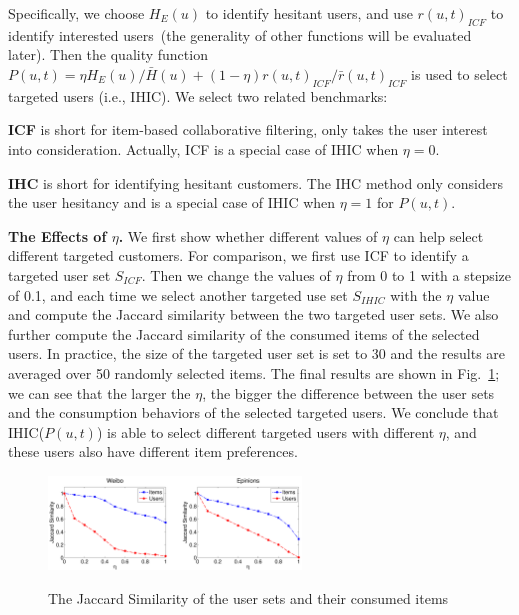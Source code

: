 \documentclass{llncs}
\begin{document}
Specifically, we choose $H_{E}(u)$ to identify hesitant users, and use $r(u,t)_{ICF}$ to identify interested users~(the generality of other functions will be evaluated later). Then the quality function $P(u,t) = \eta H_{E}(u)/ \bar{H}(u) + (1-\eta) r(u,t)_{ICF}/\bar{r}(u,t)_{ICF}$ is used to select targeted users (i.e., IHIC). We select two related benchmarks:
\begin{compactitem}
  \item \textbf{ICF} is short for item-based collaborative filtering, only takes the user interest into consideration. Actually, ICF is a special case of IHIC when $\eta = 0$.
  \item \textbf{IHC} is short for identifying hesitant customers. The IHC method only considers the user hesitancy and is a special case of IHIC when $\eta = 1$ for $P(u,t)$.
\end{compactitem}


\textbf{The Effects of $\eta$. }
We first show whether different values of $\eta$ can help select different targeted customers. For comparison, we first use ICF to identify a targeted user set $S_{ICF}$. Then we change the values of $\eta$ from 0 to 1 with a stepsize of 0.1, and each time  we select another targeted use set $S_{IHIC}$ with the $\eta$ value and compute the Jaccard similarity between the two targeted user sets. 
We also further compute the Jaccard similarity of the consumed items of the selected users. In practice, the size of the targeted user set is set to 30 and the results are averaged over 50 randomly selected items. 
The final results are shown in Fig.~\ref{fig:a1similarity}; we can see that the larger the $\eta$, the bigger the difference between the user sets and the consumption behaviors of the selected targeted users. We conclude that IHIC($P(u,t)$) is able to select different targeted users with different $\eta$, and these users also have different item preferences.
\begin{figure}[ht]
  \centering
  \includegraphics[width=0.6\textwidth]{res/isu_a_similarity.pdf}\\
   \vspace{-0.4cm}
  \caption{The Jaccard Similarity of the user sets and their consumed items}\label{fig:a1similarity}
\end{figure}
\end{document}
